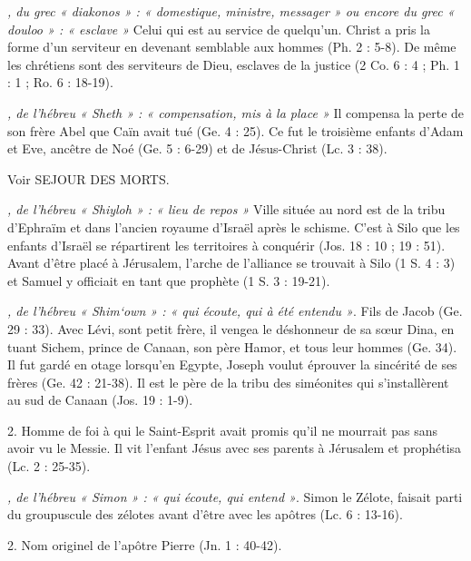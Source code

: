 \begin{multicols}{2}
\textit{, du grec « diakonos » : « domestique, ministre, messager » ou encore du grec « douloo » : « esclave »}\newline
Celui qui est au service de quelqu'un. Christ a pris la forme d'un serviteur en devenant semblable aux hommes (Ph. 2 : 5-8). De même les chrétiens sont des serviteurs de Dieu, esclaves de la justice (2 Co. 6 : 4 ; Ph. 1 : 1 ; Ro. 6 : 18-19).

\textit{, de l'hébreu « Sheth » : « compensation, mis à la place »}\newline
Il compensa la perte de son frère Abel que Caïn avait tué (Ge. 4 : 25). Ce fut le troisième enfants d'Adam et Eve, ancêtre de Noé (Ge. 5 : 6-29) et de Jésus-Christ (Lc. 3 : 38).

\textit{}\newline
Voir SEJOUR DES MORTS.

\textit{, de l'hébreu « Shiyloh » : « lieu de repos »}\newline
Ville située au nord est de la tribu d'Ephraïm et dans l'ancien royaume d'Israël après le schisme. C'est à Silo que les enfants d'Israël se répartirent les territoires à conquérir (Jos. 18 : 10 ; 19 : 51). Avant d'être placé à Jérusalem, l'arche de l'alliance se trouvait à Silo (1 S. 4 : 3) et Samuel y officiait en tant que prophète (1 S. 3 : 19-21).

\textit{, de l'hébreu « Shim`own » : « qui écoute, qui à été entendu »}. Fils de Jacob (Ge. 29 : 33). Avec Lévi, sont petit frère, il vengea le déshonneur de sa sœur Dina, en tuant Sichem, prince de Canaan, son père Hamor, et tous leur hommes (Ge. 34). Il fut gardé en otage lorsqu'en Egypte, Joseph voulut éprouver la sincérité de ses frères (Ge. 42 : 21-38). Il est le père de la tribu des siméonites qui s'installèrent au sud de Canaan (Jos. 19 : 1-9).

2. Homme de foi à qui le Saint-Esprit avait promis qu'il ne mourrait pas sans avoir vu le Messie. Il vit l'enfant Jésus avec ses parents à Jérusalem et prophétisa (Lc. 2 : 25-35).

\textit{, de l'hébreu « Simon » : « qui écoute, qui entend »}. Simon le Zélote, faisait parti du groupuscule des zélotes avant d'être avec les apôtres (Lc. 6 : 13-16).

2. Nom originel de l'apôtre Pierre (Jn. 1 : 40-42).


\end{multicols}
